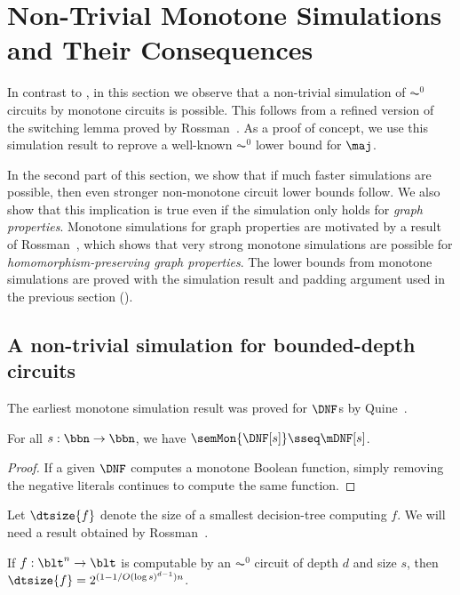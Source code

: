 \documentclass[11pt]{article}
\begin{document}
\section{Non-Trivial Monotone Simulations and Their Consequences}
\label{s:consequences}

In contrast to ,
in this section we observe that a non-trivial simulation of $\AC^0$ circuits
by monotone circuits
is possible.
This follows from a refined version of the switching lemma proved by
Rossman~\cite{rossman_entropy}.
As a proof of concept, we use this simulation result to reprove a well-known
$\AC^0$ lower bound for $\maj$.

In the second part of this section,
we show that if much faster simulations are possible,
then even stronger non-monotone circuit lower bounds follow.
We also show that this implication is true
even if the simulation only holds for \emph{graph properties}.
Monotone simulations for graph properties are motivated by a result
of Rossman~\cite{rossman_2008}, which shows that
very strong monotone simulations are possible for
\emph{homomorphism-preserving graph properties}.
The 
lower bounds
from monotone simulations 
are proved with
the simulation result and
padding argument used in the previous section
().




\subsection{A non-trivial simulation for bounded-depth circuits}
\label{s:simulations}

The earliest monotone simulation result was proved for $\DNF$s  by Quine~\cite{quine_1953}.

\begin{theorem}
    \label{t:quine_dnf}
    For all $s : \bbn \to \bbn$, we have
    $\semMon{\DNF[s]} \sseq \mDNF[s]$.
\end{theorem}
\begin{proof}
    If a given $\DNF$ computes a monotone Boolean function,
    simply removing the negative literals continues to compute the same
    function.
\end{proof}

Let $\dtsize{f}$ denote the size of a smallest decision-tree computing
$f$. We will need a result obtained by
Rossman~\cite{rossman_entropy}.

\begin{theorem}
    \label{t:ros-dt}
    If $f : \blt^n \to \blt$ is computable by an $\AC^0$ circuit of depth
    $d$ and size $s$,
    then 
    $\dtsize{f} = 
    2^{(1-{1/O(\log s)^{d-1}})n}$.
\end{theorem}
\end{document}
